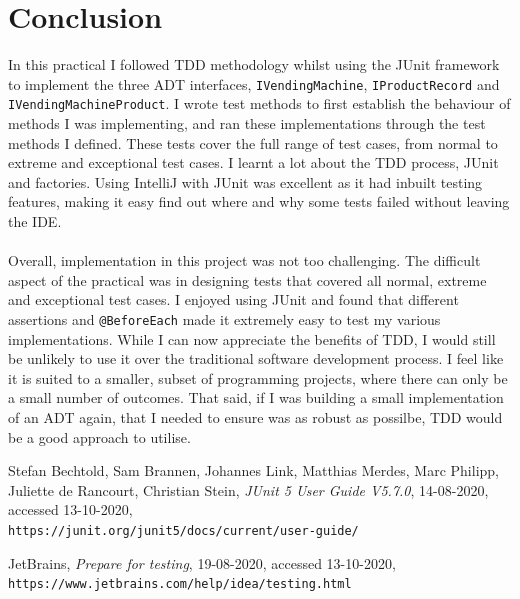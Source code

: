 \documentclass{article}
\begin{document}
\section{Conclusion}
In this practical I followed TDD methodology whilst using the JUnit framework to implement the three ADT interfaces, \verb+IVendingMachine+, \verb+IProductRecord+ and \verb+IVendingMachineProduct+. I wrote test methods to first establish the behaviour of methods I was implementing, and ran these implementations through the test methods I defined. These tests cover the full range of test cases, from normal to extreme and exceptional test cases. I learnt a lot about the TDD process, JUnit and factories. Using IntelliJ with JUnit was excellent as it had inbuilt testing features, making it easy find out where and why some tests failed without leaving the IDE. \\ \\ \noindent Overall, implementation in this project was not too challenging. The difficult aspect of the practical was in designing tests that covered all normal, extreme and exceptional test cases. I enjoyed using JUnit and found that different assertions and \verb+@BeforeEach+ made it extremely easy to test my various implementations. While I can now appreciate the benefits of TDD, I would still be unlikely to use it over the traditional software development process. I feel like it is suited to a smaller, subset of programming projects, where there can only be a small number of outcomes. That said, if I was building a small implementation of an ADT again, that I needed to ensure was as robust as possilbe, TDD would be a good approach to utilise.
\begin{thebibliography}{10}
Stefan Bechtold, Sam Brannen, Johannes Link, Matthias Merdes, Marc Philipp, Juliette de Rancourt, Christian Stein, \textit{JUnit 5 User Guide V5.7.0}, 14-08-2020, accessed 13-10-2020, \\\texttt{https://junit.org/junit5/docs/current/user-guide/}

JetBrains, \textit{Prepare for testing}, 19-08-2020, accessed 13-10-2020, \\\texttt{https://www.jetbrains.com/help/idea/testing.html}

\end{thebibliography}
\end{document}

